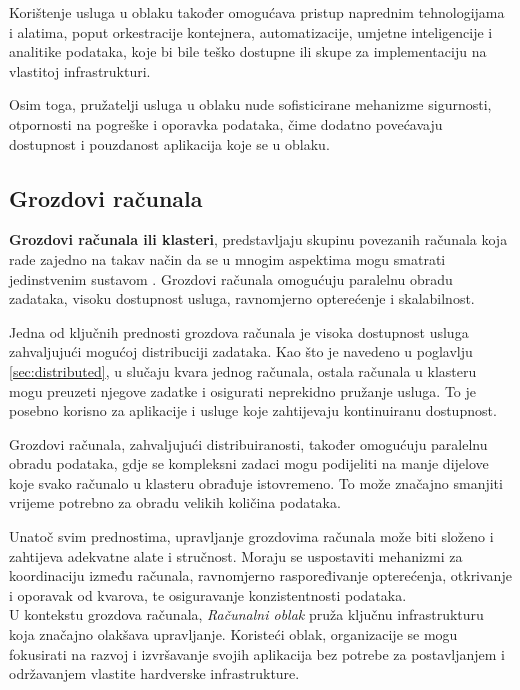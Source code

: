 \documentclass[times, utf8, diplomski]{fer}
\begin{document}
Korištenje usluga u oblaku također omogućava pristup naprednim tehnologijama i alatima, poput orkestracije kontejnera, automatizacije, umjetne inteligencije i analitike podataka, koje bi bile teško dostupne ili skupe za implementaciju na vlastitoj infrastrukturi.

Osim toga, pružatelji usluga u oblaku nude sofisticirane mehanizme sigurnosti, otpornosti na pogreške i oporavka podataka, čime dodatno povećavaju dostupnost i pouzdanost aplikacija koje se u oblaku.

\subsection{Grozdovi računala}

\textbf{Grozdovi računala ili klasteri}, predstavljaju skupinu povezanih računala koja rade zajedno na takav način da se u mnogim aspektima mogu smatrati jedinstvenim sustavom \citep{zarko_raspodijeljeni_2013}. Grozdovi računala omogućuju paralelnu obradu zadataka, visoku dostupnost usluga, ravnomjerno opterećenje i skalabilnost.

Jedna od ključnih prednosti grozdova računala je visoka dostupnost usluga zahvaljujući mogućoj distribuciji zadataka. Kao što je navedeno u poglavlju \ref{sec:distributed}, u slučaju kvara jednog računala, ostala računala u klasteru mogu preuzeti njegove zadatke i osigurati neprekidno pružanje usluga. To je posebno korisno za aplikacije i usluge koje zahtijevaju kontinuiranu dostupnost.

Grozdovi računala, zahvaljujući distribuiranosti, također omogućuju paralelnu obradu podataka, gdje se kompleksni zadaci mogu podijeliti na manje dijelove koje svako računalo u klasteru obrađuje istovremeno. To može značajno smanjiti vrijeme potrebno za obradu velikih količina podataka.

Unatoč svim prednostima, upravljanje grozdovima računala može biti složeno i zahtijeva adekvatne alate i stručnost. Moraju se uspostaviti mehanizmi za koordinaciju između računala, ravnomjerno raspoređivanje opterećenja, otkrivanje i oporavak od kvarova, te osiguravanje konzistentnosti podataka. \\

U kontekstu grozdova računala, \emph{Računalni oblak}  pruža ključnu infrastrukturu koja značajno olakšava upravljanje. Koristeći oblak, organizacije se mogu fokusirati na razvoj i izvršavanje svojih aplikacija bez potrebe za postavljanjem i održavanjem vlastite hardverske infrastrukture.
\end{document}
